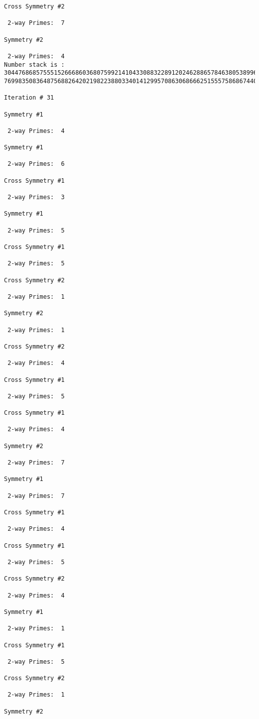 {{{{\begin{verbatim}
Cross Symmetry #2

 2-way Primes: 	7

Symmetry #2

 2-way Primes: 	4
Number stack is :
30447686857555152666860368075992141043308832289120246288657846380538996794608835958544046240163340857
76998350836487568826420219822388033401412995708630686662515557586867440375804336104264044585953880649

Iteration #	31

Symmetry #1

 2-way Primes: 	4

Symmetry #1

 2-way Primes: 	6

Cross Symmetry #1

 2-way Primes: 	3

Symmetry #1

 2-way Primes: 	5

Cross Symmetry #1

 2-way Primes: 	5

Cross Symmetry #2

 2-way Primes: 	1

Symmetry #2

 2-way Primes: 	1

Cross Symmetry #2

 2-way Primes: 	4

Cross Symmetry #1

 2-way Primes: 	5

Cross Symmetry #1

 2-way Primes: 	4

Symmetry #2

 2-way Primes: 	7

Symmetry #1

 2-way Primes: 	7

Cross Symmetry #1

 2-way Primes: 	4

Cross Symmetry #1

 2-way Primes: 	5

Cross Symmetry #2

 2-way Primes: 	4

Symmetry #1

 2-way Primes: 	1

Cross Symmetry #1

 2-way Primes: 	5

Cross Symmetry #2

 2-way Primes: 	1

Symmetry #2


\end{verbatim}}}}}
